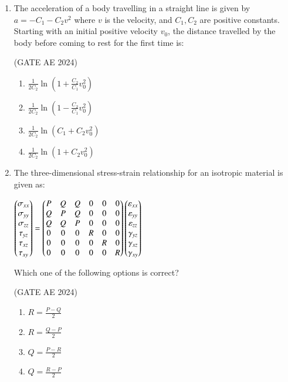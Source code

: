 \documentclass[journal,12pt,onecolumn]{IEEEtran}
\theoremstyle{remark}
\begin{document}
\begin{flushleft}
\begin{enumerate}
\item The acceleration of a body travelling in a straight line is given by $a = -C_1 - C_2v^2$ where \( v \) is the velocity, and \( C_1, C_2 \) are positive constants. Starting with an initial positive velocity \( v_0 \), the distance travelled by the body before coming to rest for the first time is: 

\hfill (GATE AE 2024)

\begin{enumerate}
    \item \( \frac{1}{2C_2} \ln\left(1 + \frac{C_2}{C_1}v_0^2\right) \)
    \item \( \frac{1}{2C_2} \ln\left(1 - \frac{C_2}{C_1}v_0^2\right) \)
    \item \( \frac{1}{2C_2} \ln(C_1 + C_2v_0^2) \)
    \item \( \frac{1}{2C_2} \ln(1 + C_2v_0^2) \)
\end{enumerate}

\item The three-dimensional stress-strain relationship for an isotropic material is given as:

$\begin{pmatrix}
\sigma_{xx} \\
\sigma_{yy} \\
\sigma_{zz} \\
\tau_{yz} \\
\tau_{xz} \\
\tau_{xy}
\end{pmatrix}=\begin{pmatrix}
P & Q & Q & 0 & 0 & 0 \\
Q & P & Q & 0 & 0 & 0 \\
Q & Q & P & 0 & 0 & 0 \\
0 & 0 & 0 & R & 0 & 0 \\
0 & 0 & 0 & 0 & R & 0 \\
0 & 0 & 0 & 0 & 0 & R\end{pmatrix}
\begin{pmatrix}
\varepsilon_{xx} \\
\varepsilon_{yy} \\
\varepsilon_{zz} \\
\gamma_{yz} \\
\gamma_{xz} \\
\gamma_{xy}\end{pmatrix}$


Which one of the following options is correct? 

\hfill (GATE AE 2024)


\begin{enumerate}
    \item \( R = \frac{P - Q}{2} \)
    \item \( R = \frac{Q - P}{2} \)
    \item \( Q = \frac{P - R}{2} \)
    \item \( Q = \frac{R - P}{2} \)
\end{enumerate}
    

\end{enumerate}
\end{flushleft}
\end{document}
